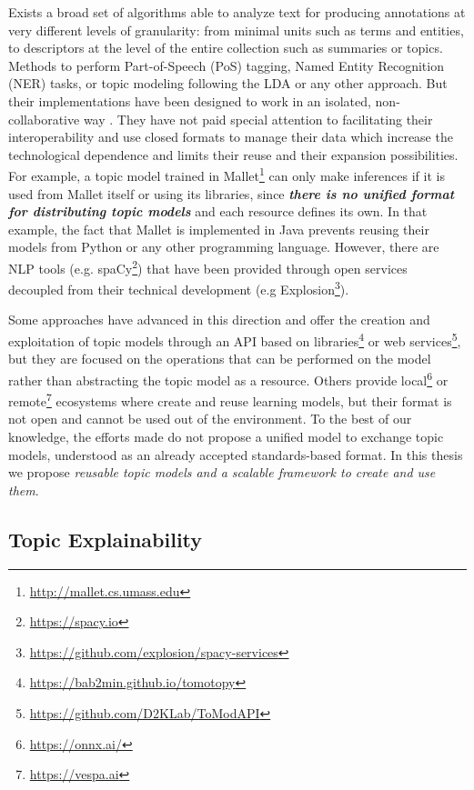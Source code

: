 Exists a broad set of algorithms able to analyze text for producing annotations at very different levels of granularity: from minimal units such as terms and entities, to descriptors at the level of the entire collection such as  summaries or topics. Methods to perform Part-of-Speech (PoS) tagging,  Named Entity Recognition (NER) tasks, or topic modeling following the LDA or any other approach. But their implementations have been designed to work in an isolated, non-collaborative way \citep{Manning2014TheToolkit, Agerri2014}. They have not paid special attention to facilitating their interoperability and use closed formats to manage their data  which increase the technological dependence and limits their reuse and their expansion possibilities. For example, a topic model trained in Mallet\footnote{\url{http://mallet.cs.umass.edu}} can only make inferences if it is used from Mallet itself or using its libraries, since \textbf{\textit{there is no unified format for distributing topic models}} and each resource defines its own. In that example, the fact that Mallet is implemented in Java prevents reusing their models from Python or any other programming language. However, there are NLP tools (e.g. spaCy\footnote{\url{https://spacy.io}}) that have been provided through open services  decoupled from their technical development (e.g Explosion\footnote{\url{https://github.com/explosion/spacy-services}}).

Some approaches have advanced in this direction and offer the creation and exploitation of topic models through an API based on libraries\footnote{\url{https://bab2min.github.io/tomotopy}} or web services\footnote{\url{https://github.com/D2KLab/ToModAPI}}\citep{Lisena:NLPOSS2020}, but they are focused on the operations that can be performed on the model rather than abstracting the topic model as a resource. Others provide local\footnote{\url{https://onnx.ai/}} or remote\footnote{\url{https://vespa.ai}} ecosystems where create and reuse learning models, but their format is not open and cannot be used out of the environment. To the best of our knowledge, the efforts made do not propose a unified model to exchange topic models, understood as an already accepted standards-based format. In this thesis we propose \textit{reusable topic models and a scalable framework to create and use them}.  
 

\subsection{Topic Explainability}
\label{sec:topic-explainability}

